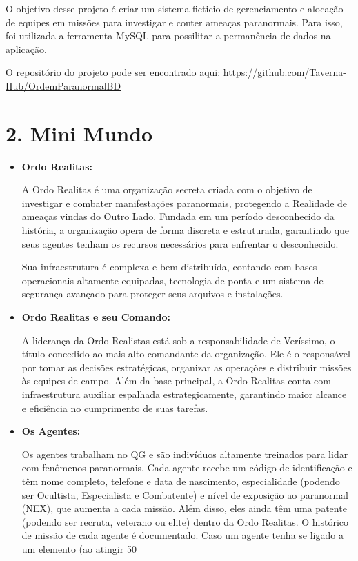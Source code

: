 \documentclass[12pt,a4paper]{report}
\begin{document}
O objetivo desse projeto é criar um sistema ficticio de gerenciamento e alocação de equipes em missões para investigar e conter ameaças paranormais. Para isso, foi utilizada a ferramenta MySQL para possilitar a permanência de dados na aplicação.

O repositório do projeto pode ser encontrado aqui: \href{https://github.com/Taverna-Hub/OrdemParanormalBD}{https://github.com/Taverna-Hub/OrdemParanormalBD}

\chapter{2. Mini Mundo}
\begin{itemize}
    \item \textbf {Ordo Realitas:} 
    
    A Ordo Realitas é uma organização secreta criada com o objetivo de investigar e combater manifestações paranormais, protegendo a Realidade de ameaças vindas do Outro Lado. Fundada em um período desconhecido da história, a organização opera de forma discreta e estruturada, garantindo que seus agentes tenham os recursos necessários para enfrentar o desconhecido. 
    
    Sua infraestrutura é complexa e bem distribuída, contando com bases operacionais altamente equipadas, tecnologia de ponta e um sistema de segurança avançado para proteger seus arquivos e instalações.

    
    \item \textbf {Ordo Realitas e seu Comando:}
    
    A liderança da Ordo Realistas está sob a responsabilidade de Veríssimo, o título concedido ao mais alto comandante da organização. Ele é o responsável por tomar as decisões estratégicas, organizar as operações e distribuir missões às equipes de campo. Além da base principal, a Ordo Realitas conta com infraestrutura auxiliar espalhada estrategicamente, garantindo maior alcance e eficiência no cumprimento de suas tarefas.
    
    \item \textbf {Os Agentes:} 
    
    Os agentes trabalham no QG e são indivíduos altamente treinados para lidar com fenômenos paranormais. Cada agente recebe um código de identificação e têm nome completo, telefone e data de nascimento, especialidade (podendo ser Ocultista, Especialista e Combatente)  e nível de exposição ao paranormal (NEX), que aumenta a cada missão. Além disso, eles ainda têm uma patente (podendo ser recruta, veterano ou elite) dentro da Ordo Realitas. O histórico de missão de cada agente é documentado. Caso um agente tenha se ligado a um elemento (ao atingir 50%
    

\end{itemize}
\end{document}

